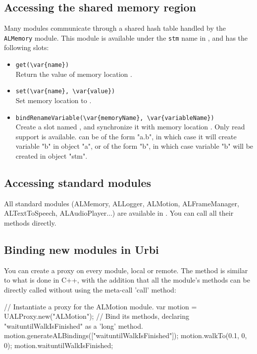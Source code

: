 \subsection{Accessing the \naoqi shared memory region}

Many \naoqi modules communicate through a shared hash table handled by
the \lstinline|ALMemory| module. This module is available under the
\lstinline|stm| name in \urbi, and has the following slots:

\begin{itemize}
\item \lstinline|get(\var{name})| \\
  Return the value of memory location .
\item \lstinline|set(\var{name}, \var{value})| \\
  Set memory location  to .
\item \lstinline|bindRenameVariable(\var{memoryName}, \var{variableName})| \\
  Create a \us slot named , and synchronize it with memory
  location . Only read support is available.
   can be of the form "a.b", in which case it will create
  variable "b" in object "a", or of the form "b", in which case variable "b"
  will be created in object "stm".
\end{itemize}

\subsection{Accessing standard \naoqi modules}

All standard \naoqi modules (ALMemory, ALLogger, ALMotion, ALFrameManager,
ALTextToSpeech, ALAudioPlayer...) are available in \urbi. You can call all
their methods directly.

\subsection{Binding new \naoqi modules in Urbi}

You can create a proxy on every \naoqi module, local or remote.
The method is similar to what is done in C++, with the addition that all the
module's methods can be directly called without using the meta-call 'call'
method:

\begin{urbiunchecked}
// Instantiate a proxy for the ALMotion module.
var motion = UALProxy.new("ALMotion");
// Bind its methods, declaring "waituntilWalkIsFinished" as a 'long' method.
motion.generateALBindings(["waituntilWalkIsFinished"]);
motion.walkTo(0.1, 0, 0);
motion.waituntilWalkIsFinished;
\end{urbiunchecked}

